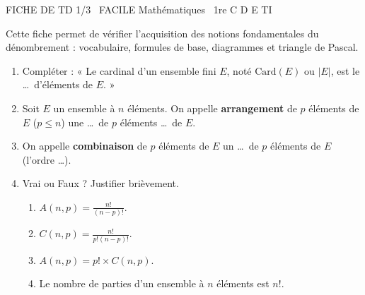 \documentclass[11pt]{article}
\begin{document}
\begin{tcolorbox}[enhanced,colback=popink,colframe=popink,arc=10pt,boxrule=0pt,left=12pt,right=12pt,top=9pt,bottom=9pt]
{\color{white}\popxbold\small FICHE DE TD 1/3 \textbullet\ FACILE \hfill Mathématiques \textbullet\ 1re C D E TI\par}
\end{tcolorbox}
\vspace{4pt}
Cette fiche permet de vérifier l'acquisition des notions fondamentales du dénombrement : vocabulaire, formules de base, diagrammes et triangle de Pascal.

\begin{exercice}
\begin{enumerate}
    \item Compléter : « Le cardinal d'un ensemble fini $E$, noté $\text{Card}(E)$ ou $|E|$, est le \ldots\ d'éléments de $E$. »
    \item Soit $E$ un ensemble à $n$ éléments. On appelle \textbf{arrangement} de $p$ éléments de $E$ ($p \le n$) une \ldots\ de $p$ éléments \ldots\ de $E$.
    \item On appelle \textbf{combinaison} de $p$ éléments de $E$ un \ldots\ de $p$ éléments de $E$ (l'ordre \ldots).
    \item Vrai ou Faux ? Justifier brièvement.
    \begin{enumerate}
        \item $A(n,p) = \frac{n!}{(n-p)!}$.
        \item $C(n,p) = \frac{n!}{p!(n-p)!}$.
        \item $A(n,p) = p! \times C(n,p)$.
        \item Le nombre de parties d'un ensemble à $n$ éléments est $n!$.
    \end{enumerate}
\end{enumerate}
\end{exercice}
\end{document}
